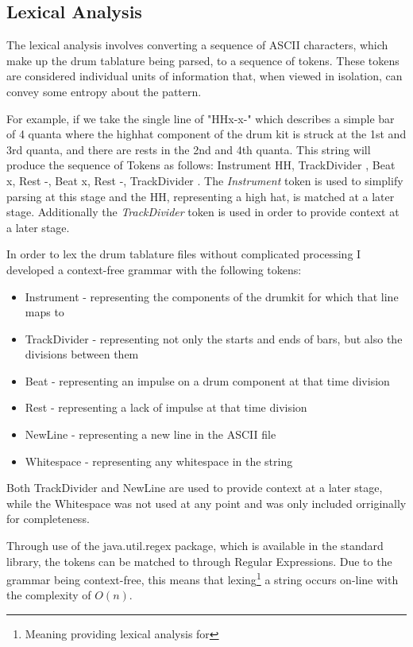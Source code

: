 \documentclass[12pt,twoside,notitlepage]{report}
\begin{document}
		

		\subsection{Lexical Analysis}
				
		
		The lexical analysis involves converting a sequence of ASCII characters, which make up the drum tablature being parsed, to a sequence of tokens. These tokens are considered individual units of information that, when viewed in isolation, can convey some entropy about the pattern.
		
		For example, if we take the single line of "HH\textpipe x-x-\textpipe" which describes a simple bar of 4 quanta where the highhat component of the drum kit is struck at the 1st and 3rd quanta, and there are rests in the 2nd and 4th quanta. This string will produce the sequence of Tokens as follows: Instrument HH, TrackDivider \textpipe, Beat x, Rest -, Beat x, Rest -, TrackDivider \textpipe. The \emph{Instrument} token is used to simplify parsing at this stage and the HH, representing a high hat, is matched at a later stage. Additionally the \emph{TrackDivider} token is used in order to provide context at a later stage.
		
		In order to lex the drum tablature files without complicated processing I developed a context-free grammar with the following tokens:
		\begin{itemize}
			\item{Instrument - representing the components of the drumkit for which that line maps to}
			\item{TrackDivider - representing not only the starts and ends of bars, but also the divisions between them}
			\item{Beat - representing an impulse on a drum component at that time division}
			\item{Rest - representing a lack of impulse at that time division}
			\item{NewLine - representing a new line in the ASCII file}
			\item{Whitespace - representing any whitespace in the string}
		\end{itemize}
		Both TrackDivider and NewLine are used to provide context at a later stage, while the Whitespace was not used at any point and was only included orriginally for completeness.
		
		Through use of the java.util.regex package, which is available in the standard library, the tokens can be matched to through Regular Expressions. Due to the grammar being context-free, this means that lexing\footnote{Meaning providing lexical analysis for} a string occurs on-line with the complexity of $O(n)$.
		
\end{document}
